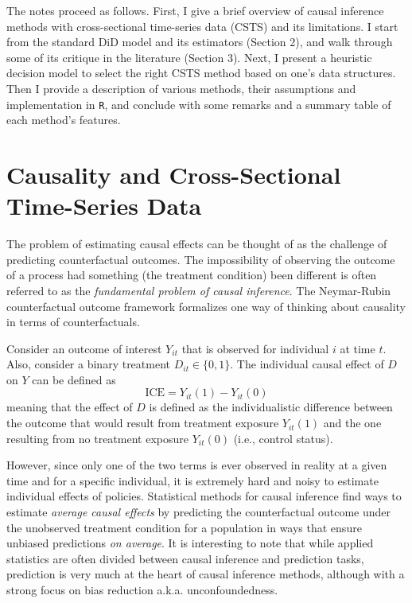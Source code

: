 \documentclass[hidelinks]{article}\usepackage[]{graphicx}\usepackage[]{xcolor}
\begin{document}
The notes proceed as follows. First, I give a brief overview of causal inference methods with cross-sectional time-series data (CSTS) and its limitations. I start from the standard DiD model and its estimators (Section 2), and walk through some of its critique in the literature (Section 3). Next, I present a heuristic decision model to select the right CSTS method based on one's data structures. Then I provide a description of various methods, their assumptions and implementation in \texttt{R}, and conclude with some remarks and a summary table of each method's features.


\section{Causality and Cross-Sectional Time-Series Data}

The problem of estimating causal effects can be thought of as the challenge of predicting counterfactual outcomes. The impossibility of observing the outcome of a process had something (the treatment condition) been different is often referred to as the \textit{fundamental problem of causal inference}. The Neymar-Rubin counterfactual outcome framework formalizes one way of thinking about causality in terms of counterfactuals. 

Consider an outcome of interest $Y_{it}$ that is observed for individual $i$ at time $t$. Also, consider a binary treatment $D_{it} \in \{ 0, 1 \}$. The individual causal effect of $D$ on $Y$ can be defined as 
$$\text{ICE} = Y_{it}(1) - Y_{it}(0)$$
meaning that the effect of $D$ is defined as the individualistic difference between the outcome that would result from treatment exposure $Y_{it}(1)$ and the one resulting from no treatment exposure $Y_{it}(0)$ (i.e., control status).

However, since only one of the two terms is ever observed in reality at a given time and for a specific individual, it is extremely hard and noisy to estimate individual effects of policies. Statistical methods for causal inference find ways to estimate \textit{average causal effects} by predicting the counterfactual outcome under the unobserved treatment condition for a population in ways that ensure unbiased predictions \textit{on average}. It is interesting to note that while applied statistics are often divided between causal inference and prediction tasks, prediction is very much at the heart of causal inference methods, although with a strong focus on bias reduction a.k.a. unconfoundedness.
\end{document}
